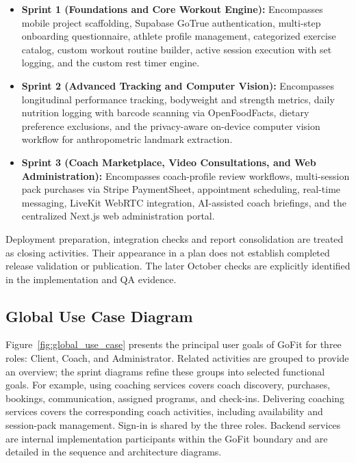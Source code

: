\documentclass[12pt,a4paper,openany]{report}
\begin{document}
\begin{itemize}
    \item \textbf{Sprint 1 (Foundations and Core Workout Engine):} Encompasses mobile project scaffolding, Supabase GoTrue authentication, multi-step onboarding questionnaire, athlete profile management, categorized exercise catalog, custom workout routine builder, active session execution with set logging, and the custom rest timer engine.
    \item \textbf{Sprint 2 (Advanced Tracking and Computer Vision):} Encompasses longitudinal performance tracking, bodyweight and strength metrics, daily nutrition logging with barcode scanning via OpenFoodFacts, dietary preference exclusions, and the privacy-aware on-device computer vision workflow for anthropometric landmark extraction.
    \item \textbf{Sprint 3 (Coach Marketplace, Video Consultations, and Web Administration):} Encompasses coach-profile review workflows, multi-session pack purchases via Stripe PaymentSheet, appointment scheduling, real-time messaging, LiveKit WebRTC integration, AI-assisted coach briefings, and the centralized Next.js web administration portal.
\end{itemize}

Deployment preparation, integration checks and report consolidation are treated as closing activities. Their appearance in a plan does not establish completed release validation or publication. The later October checks are explicitly identified in the implementation and QA evidence.

\subsection{Global Use Case Diagram}

Figure~\ref{fig:global_use_case} presents the principal user goals of GoFit for three roles: Client, Coach, and Administrator. Related activities are grouped to provide an overview; the sprint diagrams refine these groups into selected functional goals. For example, using coaching services covers coach discovery, purchases, bookings, communication, assigned programs, and check-ins. Delivering coaching services covers the corresponding coach activities, including availability and session-pack management. Sign-in is shared by the three roles. Backend services are internal implementation participants within the GoFit boundary and are detailed in the sequence and architecture diagrams.
\end{document}
